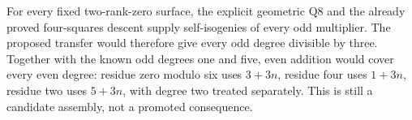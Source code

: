 For every fixed two-rank-zero surface, the explicit geometric Q8
and the already proved four-squares descent supply self-isogenies
of every odd multiplier. The proposed transfer would therefore
give every odd degree divisible by three. Together with the known
odd degrees one and five, even addition would cover every even
degree: residue zero modulo six uses $3+3n$, residue four uses
$1+3n$, residue two uses $5+3n$, with degree two treated separately.
This is still a candidate assembly, not a promoted consequence.

